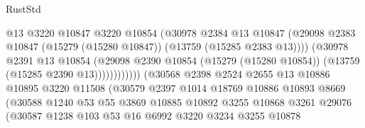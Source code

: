 \begin{lexlean}{RustStd}
\begin{coremodule}
                                          @13
                                          @3220
                                          @10847
                                          @3220
                                          @10854
                                          (@30978
                                            @2384
                                            @13
                                            @10847
                                            (@29098
                                              @2383
                                              @10847
                                              (@15279 (@15280 @10847))
                                              (@13759 (@15285 @2383 @13))))
                                          (@30978
                                            @2391
                                            @13
                                            @10854
                                            (@29098
                                              @2390
                                              @10854
                                              (@15279 (@15280 @10854))
                                              (@13759 (@15285 @2390 @13))))))))))))
                          (@30568
                            @2398
                            @2524
                            @2655
                            @13
                            @10886
                            @10895
                            @3220
                            @11508
                            (@30579
                              @2397
                              @1014
                              @18769
                              @10886
                              @10893
                              @8669
                              (@30588
                                @1240
                                @53
                                @55
                                @3869
                                @10885
                                @10892
                                @3255
                                @10868
                                @3261
                                @29076
                                (@30587
                                  @1238
                                  @103
                                  @53
                                  @16
                                  @6992
                                  @3220
                                  @3234
                                  @3255
                                  @10878

\end{coremodule}
\end{lexlean}
